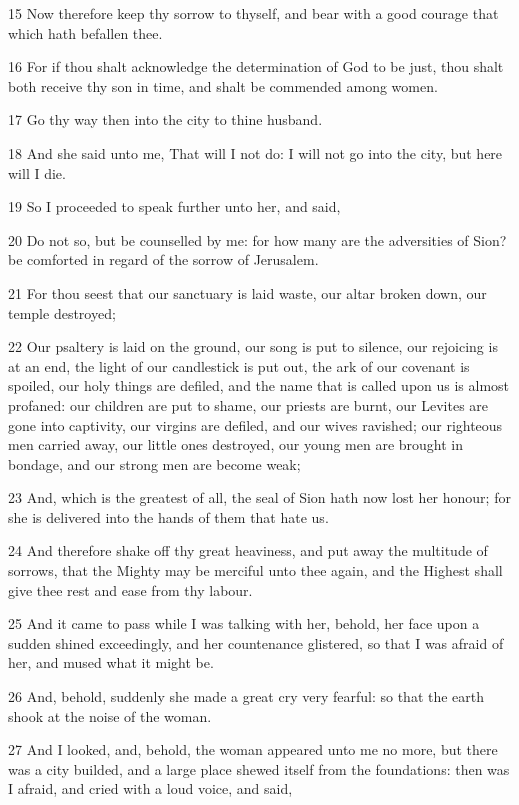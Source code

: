 \par 15 Now therefore keep thy sorrow to thyself, and bear with a good courage that which hath befallen thee.
\par 16 For if thou shalt acknowledge the determination of God to be just, thou shalt both receive thy son in time, and shalt be commended among women.
\par 17 Go thy way then into the city to thine husband.
\par 18 And she said unto me, That will I not do: I will not go into the city, but here will I die.
\par 19 So I proceeded to speak further unto her, and said,
\par 20 Do not so, but be counselled by me: for how many are the adversities of Sion? be comforted in regard of the sorrow of Jerusalem.
\par 21 For thou seest that our sanctuary is laid waste, our altar broken down, our temple destroyed;
\par 22 Our psaltery is laid on the ground, our song is put to silence, our rejoicing is at an end, the light of our candlestick is put out, the ark of our covenant is spoiled, our holy things are defiled, and the name that is called upon us is almost profaned: our children are put to shame, our priests are burnt, our Levites are gone into captivity, our virgins are defiled, and our wives ravished; our righteous men carried away, our little ones destroyed, our young men are brought in bondage, and our strong men are become weak;
\par 23 And, which is the greatest of all, the seal of Sion hath now lost her honour; for she is delivered into the hands of them that hate us.
\par 24 And therefore shake off thy great heaviness, and put away the multitude of sorrows, that the Mighty may be merciful unto thee again, and the Highest shall give thee rest and ease from thy labour.
\par 25 And it came to pass while I was talking with her, behold, her face upon a sudden shined exceedingly, and her countenance glistered, so that I was afraid of her, and mused what it might be.
\par 26 And, behold, suddenly she made a great cry very fearful: so that the earth shook at the noise of the woman.
\par 27 And I looked, and, behold, the woman appeared unto me no more, but there was a city builded, and a large place shewed itself from the foundations: then was I afraid, and cried with a loud voice, and said,
